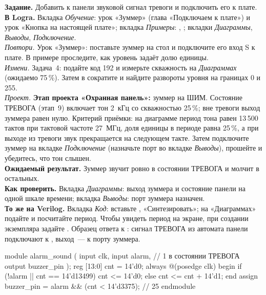 \begin{diybox}
\textbf{Задание.} Добавить к панели звуковой сигнал тревоги и подключить его к
плате.\\
\textbf{В Logra.} Вкладка \emph{Обучение}: урок «Зуммер» (глава «Подключаем к
плате») и урок «Кнопка на настоящей плате»; вкладка \emph{Примеры}: ,
; вкладки \emph{Диаграммы}, \emph{Выводы}, \emph{Подключение}.\\
 \emph{Повтори.} Урок «Зуммер»: поставьте зуммер на стол и подключите
его вход S к плате. В примере  проследите, как уровень задаёт долю
единицы.\\
 \emph{Измени.} Задача~4: подайте код 192 и измерьте скважность на
\emph{Диаграммах} (ожидаемо 75\,\%). Затем в  сократите
 и найдите развороты уровня на границах 0 и 255.\\
 \emph{Проект.} \textbf{Этап проекта «Охранная панель»:} зуммер
на ШИМ. Состояние ТРЕВОГА (этап~9) включает тон 2~кГц со скважностью 25\,\%;
вне тревоги выход зуммера равен нулю. Критерий приёмки: на диаграмме
период тона равен 13\,500 тактов при тактовой частоте 27~МГц, доля единицы
в периоде равна 25\,\%, а при выходе из тревоги звук прекращается на
следующем такте. Затем подключите зуммер на вкладке \emph{Подключение}
(назначьте порт во вкладке \emph{Выводы}), прошейте и убедитесь, что тон
слышен.\\
\textbf{Ожидаемый результат.} Зуммер звучит ровно в состоянии ТРЕВОГА и
молчит в остальных.\\
\textbf{Как проверить.} Вкладка \emph{Диаграммы}: выход зуммера и состояние
панели на одной шкале времени; вкладка \emph{Выводы}: порт зуммера назначен.\\
\textbf{То же на Verilog.} Вкладка \emph{Код}: вставьте ,
«Синтезировать»; на «Диаграммах» подайте  и посчитайте период.
Чтобы увидеть период на экране, при создании экземпляра задайте
. Образец ответа к : сигнал
ТРЕВОГА из автомата панели подключают к , выход~--- к порту зуммера.
\end{diybox}

\begin{vcode}
module alarm_sound (
    input  clk,
    input  alarm,                // 1 в состоянии ТРЕВОГА
    output buzzer_pin
);
    reg [13:0] cnt = 14'd0;
    always @(posedge clk) begin
        if (!alarm || cnt == 14'd13499) cnt <= 14'd0;
        else                            cnt <= cnt + 14'd1;
    end
    assign buzzer_pin = alarm && (cnt < 14'd3375);   // 25 %
endmodule
\end{vcode}


